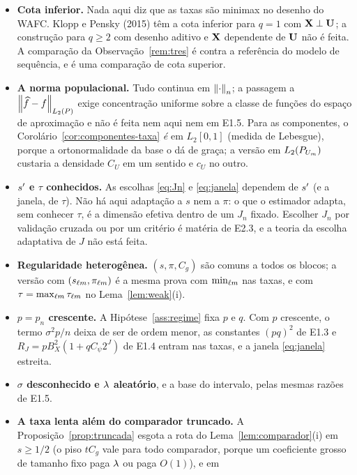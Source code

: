 \documentclass[11pt,a4paper]{article}
\begin{document}
\begin{itemize}[nosep, leftmargin=*]
  \item \textbf{Cota inferior.} Nada aqui diz que as taxas são minimax no
    desenho do WAFC. Klopp e Pensky (2015) têm a cota inferior para $q = 1$ com
    $\mathbf{X} \perp \mathbf{U}$; a construção para $q \ge 2$ com desenho aditivo e $\mathbf{X}$
    dependente de $\mathbf{U}$ não é feita. A comparação da
    Observação~\ref{rem:tres} é contra a referência do modelo de sequência, e
    é uma comparação de cota superior.
  \item \textbf{A norma populacional.} Tudo continua em $\left\lVert \cdot \right\rVert_{n}$; a
    passagem a $\left\lVert \widehat f - f \right\rVert_{L_{2}(P)}$ exige concentração uniforme
    sobre a classe de funções do espaço de aproximação e não é feita nem aqui
    nem em E1.5. Para as componentes, o Corolário~\ref{cor:componentes-taxa} \emph{é} em
    $L_{2}[0,1]$ (medida de Lebesgue), porque a ortonormalidade da base o dá
    de graça; a versão em $L_{2}(P_{U_{m}})$ custaria a densidade $C_{U}$ em
    um sentido e $c_{U}$ no outro.
  \item \textbf{$s'$ e $\tau$ conhecidos.} As escolhas \eqref{eq:Jn} e
    \eqref{eq:janela} dependem de $s'$ (e a janela, de $\tau$). Não há aqui
    adaptação a $s$ nem a $\pi$: o que o estimador adapta, sem conhecer $\tau$,
    é a dimensão efetiva dentro de um $J_{n}$ fixado. Escolher $J_{n}$ por
    validação cruzada ou por um critério é matéria de E2.3, e a teoria da
    escolha adaptativa de $J$ não está feita.
  \item \textbf{Regularidade heterogênea.} $(s,\pi,C_{g})$ são comuns a todos
    os blocos; a versão com $(s_{\ell m},\pi_{\ell m})$ é a mesma prova com
    $\min_{\ell m}$ nas taxas, e com $\tau = \max_{\ell m}\tau_{\ell m}$ no
    Lema~\ref{lem:weak}(i).
  \item \textbf{$p = p_{n}$ crescente.} A Hipótese~\ref{ass:regime} fixa $p$ e
    $q$. Com $p$ crescente, o termo $\sigma^{2}p/n$ deixa de ser de ordem
    menor, as constantes $(pq)^{2}$ de E1.3 e $R_{J} = pB_{X}^{2}(1+qC_{\psi}
    2^{J})$ de E1.4 entram nas taxas, e a janela \eqref{eq:janela} estreita.
  \item \textbf{$\sigma$ desconhecido e $\lambda$ aleatório}, e a base do
    intervalo, pelas mesmas razões de E1.5.
  \item \textbf{A taxa lenta além do comparador truncado.} A
    Proposição~\ref{prop:truncada} esgota a rota do Lema~\ref{lem:comparador}(i)
    em $s \ge 1/2$ (o piso $tC_{g}$ vale para todo comparador, porque um
    coeficiente grosso de tamanho fixo paga $\lambda$ ou paga $O(1)$), e em

\end{itemize}
\end{document}
